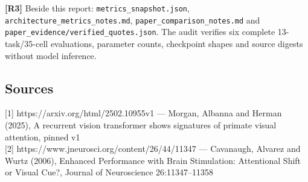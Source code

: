 \documentclass[
  10pt,
]{article}
\begin{document}
\textbf{{[}R3{]}} Beside this report: \texttt{metrics\_snapshot.json},
\texttt{architecture\_metrics\_notes.md},
\texttt{paper\_comparison\_notes.md} and
\texttt{paper\_evidence/verified\_quotes.json}. The audit verifies six
complete 13-task/35-cell evaluations, parameter counts, checkpoint
shapes and source digests without model inference.

\subsection{Sources}\label{sources}

{[}1{]} https://arxiv.org/html/2502.10955v1 --- Morgan, Albanna and
Herman (2025), A recurrent vision transformer shows signatures of
primate visual attention, pinned v1\\
{[}2{]} https://www.jneurosci.org/content/26/44/11347 --- Cavanaugh,
Alvarez and Wurtz (2006), Enhanced Performance with Brain Stimulation:
Attentional Shift or Visual Cue?, Journal of Neuroscience
26:11347--11358
\end{document}
